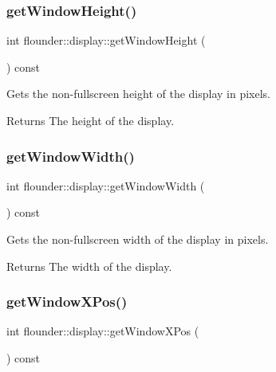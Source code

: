 \subsubsection{\texorpdfstring{get\+Window\+Height()}{getWindowHeight()}}
{\footnotesize\ttfamily int flounder\+::display\+::get\+Window\+Height (\begin{DoxyParamCaption}{ }\end{DoxyParamCaption}) const\hspace{0.3cm}{\ttfamily [inline]}}



Gets the non-\/fullscreen height of the display in pixels. 

\begin{DoxyReturn}{Returns}
The height of the display. 
\end{DoxyReturn}
\mbox{\label{classflounder_1_1display_ae0b1039d92aa73d05a9b5791dceaa7d6}} 
\subsubsection{\texorpdfstring{get\+Window\+Width()}{getWindowWidth()}}
{\footnotesize\ttfamily int flounder\+::display\+::get\+Window\+Width (\begin{DoxyParamCaption}{ }\end{DoxyParamCaption}) const\hspace{0.3cm}{\ttfamily [inline]}}



Gets the non-\/fullscreen width of the display in pixels. 

\begin{DoxyReturn}{Returns}
The width of the display. 
\end{DoxyReturn}
\mbox{\label{classflounder_1_1display_aa3fe6abea98c07ce3dbbb01ea6d3eceb}} 
\subsubsection{\texorpdfstring{get\+Window\+X\+Pos()}{getWindowXPos()}}
{\footnotesize\ttfamily int flounder\+::display\+::get\+Window\+X\+Pos (\begin{DoxyParamCaption}{ }\end{DoxyParamCaption}) const\hspace{0.3cm}{\ttfamily [inline]}}



